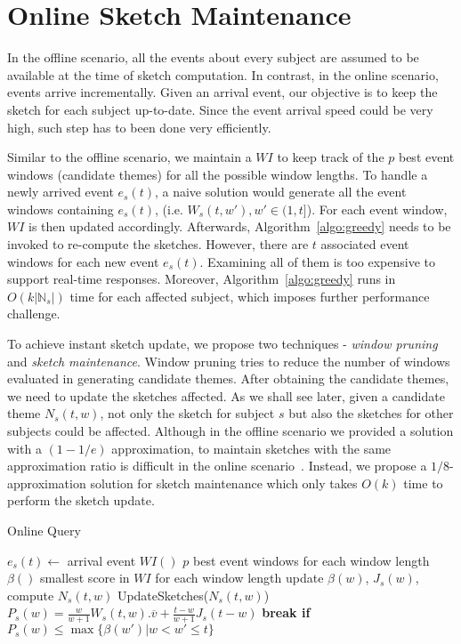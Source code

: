 \section {Online Sketch Maintenance}\label{sec:online}
In the offline scenario, all the events about every subject are assumed 
to be available at the time of sketch computation. 
In contrast, in the online scenario,
events arrive incrementally. 
Given an arrival event, our objective is to keep the sketch 
for each subject up-to-date. Since the event arrival speed could be very high, such step has to been done very efficiently.  

Similar to the offline scenario, we maintain a $WI$ to keep 
track of the $p$ best event windows (candidate themes) 
for all the possible window lengths.
To handle a newly arrived event $e_s(t)$, a naive solution would generate
all the event windows containing $e_s(t)$, (i.e. $W_s(t,w'), w'\in(1,t]$). For each
event window, $WI$ is then updated accordingly. 
Afterwards, Algorithm~\ref{algo:greedy} needs to be
invoked to re-compute the sketches. 
However, there are $t$ associated event windows for each new event $e_s(t)$. 
Examining all of them is too expensive to support real-time responses. 
Moreover, Algorithm~\ref{algo:greedy} runs in $O(k|\mathbb{N}_s|)$ time for each affected subject, which imposes further performance challenge. 

To achieve instant sketch update, we propose two techniques - \emph{window pruning} and \emph{sketch maintenance}. Window pruning tries to reduce the number of windows evaluated in generating candidate themes. After obtaining the candidate themes, we need to update the sketches affected. As we shall see later, given a candidate theme $N_s(t,w)$, not only the sketch for subject $s$ but also the sketches for other subjects could be affected. Although in the offline scenario we provided a solution with a $(1-1/e)$ approximation, to maintain sketches with the same approximation ratio is difficult in the online scenario~\cite{Alonerbuch2003The,Awerbuch1996Making}. Instead, we propose a $1/8$-approximation solution for sketch maintenance which only takes $O(k)$ time to perform the sketch update.

\begin{algorithm}[h]
\caption{Online Query}\label{algo:online_overview}
\begin{algorithmic}[1]
\Require $e_s(t) \gets $ arrival event
\State $WI()$ $p$ best event windows for each window length
\State $\beta()$ smallest score in $WI$ for each window length
\State update $\beta(w)$, $J_s(w)$, compute $N_s(t,w)$ 
\State UpdateSketches($N_s(t,w)$)
\EndIf
\State $P_s(w) = \frac{w}{w+1}W_s(t,w).\overline{v}+\frac{t-w}{w+1}J_s(t-w)$
\State \bf{break} if $P_s(w)\leq \max\{\beta(w')|w < w' \leq t\}$
\EndFor
\end{algorithmic}
\end{algorithm}

